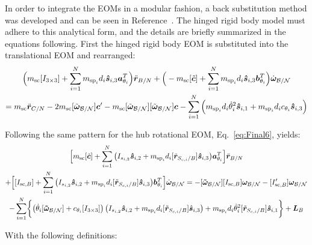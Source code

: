 In order to integrate the EOMs in a modular fashion, a back substitution method was developed and can be seen in Reference~\cite{Allard2016rz}. The hinged rigid body model must adhere to this analytical form, and the details are briefly summarized in the equations following. First the hinged rigid body EOM is substituted into the translational EOM and rearranged:
\begin{multline}
\Big(m_{\text{sc}} [I_{3\times3}] +\sum_{i=1}^{N}m_{\text{sp}_i}d_i \bm{\hat{s}}_{i,3} \bm a_{\theta_i}^T\Big)\ddot{\bm r}_{B/N}+\Big(-m_{\text{sc}} [\tilde{\bm{c}}] +\sum_{i=1}^{N}m_{\text{sp}_i}d_i \bm{\hat{s}}_{i,3} \bm b_{\theta_i}^T\Big) \dot{\bm\omega}_{\cal B/N} \\
= m_{\text{sc}} \ddot{\bm r}_{C/N} 	- 2 m_{\text{sc}} [\tilde{\bm\omega}_{\cal B/N}] \bm c'
-m_{\text{sc}} [\tilde{\bm\omega}_{\cal B/N}][\tilde{\bm\omega}_{\cal B/N}]\bm{c}
-\sum_{i=1}^{N}\Big(m_{\text{sp}_i}d_i \dot{\theta}_i^2 \bm{\hat{s}}_{i,1}+m_{\text{sp}_i}d_i c_{\theta_i} \bm{\hat{s}}_{i,3} \Big)
\label{eq:Rbddot8}
\end{multline}

Following the same pattern for the hub rotational EOM, Eq.~\eqref{eq:Final6}, yields:
\begin{multline}
\Big[m_{\text{sc}}[\tilde{\bm{c}}] +\sum\limits_{i=1}^{N}\big( I_{s_{i,2}}\bm{\hat{s}}_{i,2}+m_{\text{sp}_i}d_i [\tilde{\bm{r}}_{S_{c,i}/B}] \bm{\hat{s}}_{i,3}\big)\bm a_{\theta_i}^T \Big]\ddot{\bm r}_{B/N}\\
+\Big[[I_{\text{sc},B}]+\sum\limits_{i=1}^{N}\big( I_{s_{i,2}}\bm{\hat{s}}_{i,2}+m_{\text{sp}_i}d_i [\tilde{\bm{r}}_{S_{c,i}/B}] \bm{\hat{s}}_{i,3}\big) \bm b_{\theta_i}^T\Big] \dot{\bm\omega}_{\cal B/N}
= 
-[\bm{\tilde{\omega}}_{\cal B/N}] [I_{\text{sc},B}] \bm\omega_{\cal B/N} 
- [I'_{\text{sc},B}] \bm\omega_{\cal B/N} \\
-\sum\limits_{i=1}^{N}\biggl\lbrace\big(\dot{\theta}_i [\bm{\tilde{\omega}}_{\cal B/N}] +c_{\theta_i} [I_{3\times3}]\big) \left(I_{s_{i,2}} \bm{\hat{s}}_{i,2}+m_{\text{sp}_i} d_i [\tilde{\bm{r}}_{S_{c,i}/B}] \hat{\bm s}_{i,3}\right) +m_{\text{sp}_i}d_i\dot{\theta}_i^2[\tilde{\bm{r}}_{S_{c,i}/B}] \bm{\hat{s}}_{i,1} \biggr\rbrace + \bm{L}_B
\label{eq:Final9}
\end{multline}	

With the following definitions:

